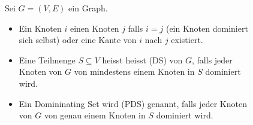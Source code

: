 \begin{frame}[label=repetition]
\begin{figure}[fragile]
\begin{mydefinition}\label{mydefinition:DominatingSet}
Sei $G = (V, E)$ ein Graph.
\begin{itemize}
    \item Ein Knoten $i$  einen Knoten $j$ falls $i = j$ (ein Knoten dominiert sich selbst) oder eine Kante von $i$ nach $j$ existiert.
    \item Eine Teilmenge $S\subseteq V$ heisst heisst  (DS) von $G$, falls jeder Knoten von $G$ von mindestens einem Knoten in $S$ dominiert wird.
    \item Ein Domininating Set wird  (PDS) genannt, falls jeder Knoten von $G$ von genau einem Knoten in $S$ dominiert wird.
\end{itemize}
\end{mydefinition}
\end{figure}
\end{frame}


